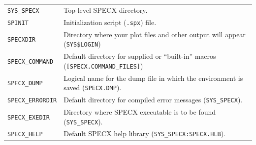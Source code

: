 \documentclass[11pt,twoside]{report}
\begin{document}
\begin{tabular}{ll}
\verb+SYS_SPECX+ &      \begin{minipage}[t]{4.5in}
                        Top-level SPECX directory.
                        \end{minipage}\\
\verb+SPINIT+    &      \begin{minipage}[t]{4.5in}
                        Initialization script (\verb+.spx+) file.
                        \end{minipage}\\
\verb+SPECXDIR+ &       \begin{minipage}[t]{4.5in}
                        Directory where your plot files and other output will
                        appear (\verb+SYS$LOGIN+)
                        \end{minipage}\\
\verb+SPECX_COMMAND+ &  \begin{minipage}[t]{4.5in}
                        Default directory for supplied or ``built-in'' macros
                        (\verb+[SPECX.COMMAND_FILES]+)
                        \end{minipage}\\
\verb+SPECX_DUMP+ &     \begin{minipage}[t]{4.5in}
                        Logical name for the dump file in which the environment
                        is saved (\verb+SPECX.DMP+).
                        \end{minipage}\\
\verb+SPECX_ERRORDIR+ & \begin{minipage}[t]{4.5in}
                        Default directory for compiled error messages
                        (\verb+SYS_SPECX+).
                        \end{minipage}\\
\verb+SPECX_EXEDIR+ &   \begin{minipage}[t]{4.5in}
                        Directory where SPECX executable is to be found
                        (\verb+SYS_SPECX+).
                        \end{minipage}\\
\verb+SPECX_HELP+ &     \begin{minipage}[t]{4.5in}
                        Default SPECX help library
                        (\verb+SYS_SPECX:SPECX.HLB+).
                        \end{minipage}\\

\end{tabular}
\end{document}
